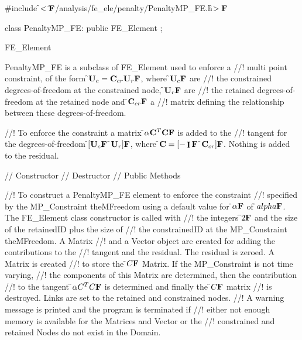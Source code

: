 
\indent \#include \f$<\tilde{ }{\bf F}$/analysis/fe\_ele/penalty/PenaltyMP\_FE.h\f$>{\bf F}$

\indent class PenaltyMP\_FE: public FE\_Element ;

\indent FE\_Element
\indent{} 

\indent PenaltyMP\_FE is a subclass of FE\_Element used to enforce a
//! multi point constraint, of the form \f${\bf U}_c = {\bf C}_{cr} {\bf U}_r{\bf F}$, where \f${\bf U}_c{\bf F}$ are
//! the constrained degrees-of-freedom at the constrained node, \f${\bf U}_r{\bf F}$ are
//! the retained degrees-of-freedom at the retained node and \f${\bf C}_{cr}{\bf F}$ a
//! matrix defining the relationship between these degrees-of-freedom. 

//! To enforce the constraint a matrix \f$\alpha {\bf C}^T {\bf C}{\bf F}$ is added to the
//! tangent for the degrees-of-freedom \f$[{\bf U}_c{\bf F}$ \f${\bf U}_r]{\bf F}$, where \f${\bf C} = [-\mathop{\cal {\bf I}}{\bf F}$ 
\f${\bf C}_{cr}]{\bf F}$. Nothing is added to the residual.  

\indent\indent // Constructor
\indent{}
\indent\indent // Destructor
\indent{}
\indent\indent // Public Methods
\indent{} 
\indent{}  
\indent{} 
\indent{}

//! To construct a PenaltyMP\_FE element to enforce the constraint
//! specified by the MP\_Constraint \p theMFreedom using a default value for
\f$\alpha{\bf F}$ of \f$alpha{\bf F}$. The FE\_Element class constructor is called with
//! the integers \f$2{\bf F}$ and the size of the \p retainedID plus the size of
//! the \p constrainedID at the MP\_Constraint \p theMFreedom. A Matrix
//! and a Vector object are created for adding the contributions to the
//! tangent and the residual. The residual is zeroed. A Matrix is created
//! to store the \f$C{\bf F}$ Matrix. If the MP\_Constraint is not time varying,
//! the components of this Matrix are determined, then the contribution
//! to the tangent \f$\alpha C^TC{\bf F}$ is determined and finally the \f$C{\bf F}$ matrix
//! is destroyed. Links are set to the retained and constrained nodes.
//! A warning message is printed and the program is terminated if
//! either not enough memory is available for the Matrices and Vector or the
//! constrained and retained Nodes do not exist in the Domain.



